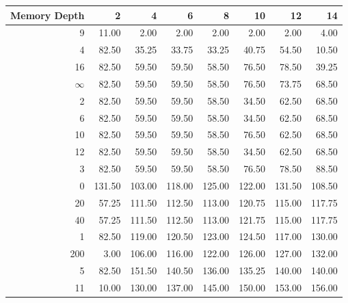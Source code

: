 \begin{tabular}{rrrrrrrr}
\toprule
 Memory Depth &       2 &       4 &       6 &       8 &      10 &      12 &      14 \\
\midrule
            9 &   11.00 &    2.00 &    2.00 &    2.00 &    2.00 &    2.00 &    4.00 \\
            4 &   82.50 &   35.25 &   33.75 &   33.25 &   40.75 &   54.50 &   10.50 \\
           16 &   82.50 &   59.50 &   59.50 &   58.50 &   76.50 &   78.50 &   39.25 \\
           $\infty$ &   82.50 &   59.50 &   59.50 &   58.50 &   76.50 &   73.75 &   68.50 \\
            2 &   82.50 &   59.50 &   59.50 &   58.50 &   34.50 &   62.50 &   68.50 \\
            6 &   82.50 &   59.50 &   59.50 &   58.50 &   34.50 &   62.50 &   68.50 \\
           10 &   82.50 &   59.50 &   59.50 &   58.50 &   76.50 &   62.50 &   68.50 \\
           12 &   82.50 &   59.50 &   59.50 &   58.50 &   34.50 &   62.50 &   68.50 \\
            3 &   82.50 &   59.50 &   59.50 &   58.50 &   76.50 &   78.50 &   88.50 \\
            0 &  131.50 &  103.00 &  118.00 &  125.00 &  122.00 &  131.50 &  108.50 \\
           20 &   57.25 &  111.50 &  112.50 &  113.00 &  120.75 &  115.00 &  117.75 \\
           40 &   57.25 &  111.50 &  112.50 &  113.00 &  121.75 &  115.00 &  117.75 \\
            1 &   82.50 &  119.00 &  120.50 &  123.00 &  124.50 &  117.00 &  130.00 \\
          200 &    3.00 &  106.00 &  116.00 &  122.00 &  126.00 &  127.00 &  132.00 \\
            5 &   82.50 &  151.50 &  140.50 &  136.00 &  135.25 &  140.00 &  140.00 \\
           11 &   10.00 &  130.00 &  137.00 &  145.00 &  150.00 &  153.00 &  156.00 \\
\bottomrule
\end{tabular}
